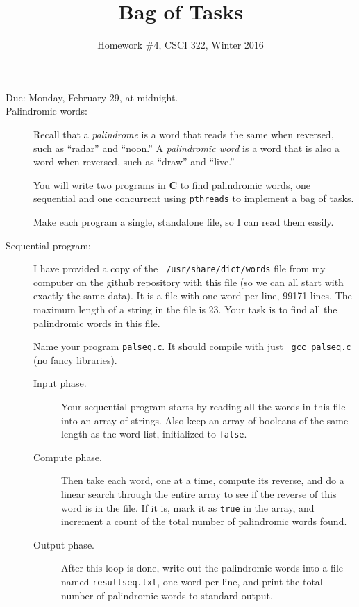 \documentclass{article}
\title{Bag of Tasks}
\author{Homework \#4, CSCI 322, Winter 2016}
\date{}
\begin{document}
\maketitle

\begin{description}

\item[Due:  Monday, February 29, at  midnight.]

\item[Palindromic words:] Recall that a {\em palindrome} is a word
  that reads the same when reversed, such as ``radar'' and ``noon.''
  A {\em palindromic word} is a word that is also a word when
  reversed, such as ``draw'' and ``live.''

  You will write two programs in {\bf C} to find palindromic words,
  one sequential and one concurrent using {\tt pthreads}
  to implement a bag of tasks.

  Make each program a single, standalone file, so I can read them
  easily.
  

\item[Sequential program:]  I have provided a copy of the {\tt
  /usr/share/dict/words} file from my computer on the github
  repository with this file (so we can all start with exactly the
  same data).  It is a file with one word per line, 99171 lines.
  The maximum length of a string in the file is 23.  Your task is to
  find all the palindromic words in this file.

  Name your program {\tt palseq.c}.  It should compile with just {\tt
    gcc palseq.c} (no fancy libraries).
  
\begin{description}
\item[Input phase.]
  Your sequential program starts by reading all the words in this file
  into an array of strings.  Also keep an array of booleans of the
  same length as the word list, initialized to {\tt false}.
\item[Compute phase.]  Then take each word, one at a time,
  compute its reverse, and do a linear search through the entire array
  to see if the reverse of this word is in the file.  If it is, mark
  it as {\tt true} in the array, and increment a count of the total
  number of palindromic words found.
\item[Output phase.]
  After this loop is done, write out the palindromic words into a file
  named {\tt resultseq.txt}, one word per line, and print the total
  number of palindromic words to standard output.
\end{description}


\end{description}
\end{document}
